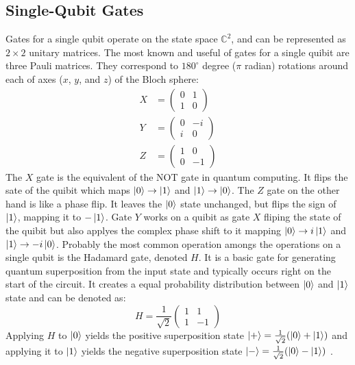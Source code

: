\subsection{Single-Qubit Gates}
Gates for a single qubit operate on the state space $\mathbb{C}^2$, and can be represented as $2 \times 2$ unitary matrices.
%
%
The most known and useful of gates for a single quibit are three Pauli matrices.
They correspond to $180^{\circ}$ degree ($\pi$ radian) rotations around each of axes ($x$, $y$, and $z$) of the Bloch sphere:
%
%
\begin{align}
    X &= \begin{pmatrix} 0 & 1 \\ 1 & 0 \end{pmatrix} \\
    Y &= \begin{pmatrix} 0 & -i \\ i & 0 \end{pmatrix} \\
    Z &= \begin{pmatrix} 1 & 0 \\ 0 & -1 \end{pmatrix}
\end{align}
%
%
The $X$ gate is the equivalent of the NOT gate in quantum computing. 
It flips the sate of the quibit which maps $\ket{0} \to \ket{1}$ and $\ket{1} \to \ket{0}$.
%
%
The $Z$ gate on the other hand is like a phase flip.
It leaves the $\ket{0}$ state unchanged, but flips the sign of $\ket{1}$, mapping it to $-\ket{1}$.
%
%
Gate $Y$ works on a quibit as gate $X$ fliping the state of the quibit but also applyes the complex phase shift to it mapping 
$\ket{0} \to i\ket{1}$ and $\ket{1} \to -i\ket{0}$.
%
%
Probably the most common operation amongs the operations on a single qubit is the Hadamard gate, denoted $H$.
It is a basic gate for generating quantum superposition from the input state and typically occurs right on the start of the circuit.
It creates a equal probability distribution between $\ket{0}$ and $\ket{1}$ state and can be denoted as:
%
%
\bigskip
\begin{equation}
    H = \frac{1}{\sqrt{2}}\begin{pmatrix} 1 & 1 \\ 1 & -1 \end{pmatrix}
\end{equation}
\bigskip
%
%
Applying $H$ to $\ket{0}$ yields the positive superposition state $\ket{+} = \frac{1}{\sqrt{2}}(\ket{0} + \ket{1})$ and 
applying it to $\ket{1}$ yields the negative superposition state $\ket{-} = \frac{1}{\sqrt{2}}(\ket{0} - \ket{1})$ \cite{mermin2007quantum}.
